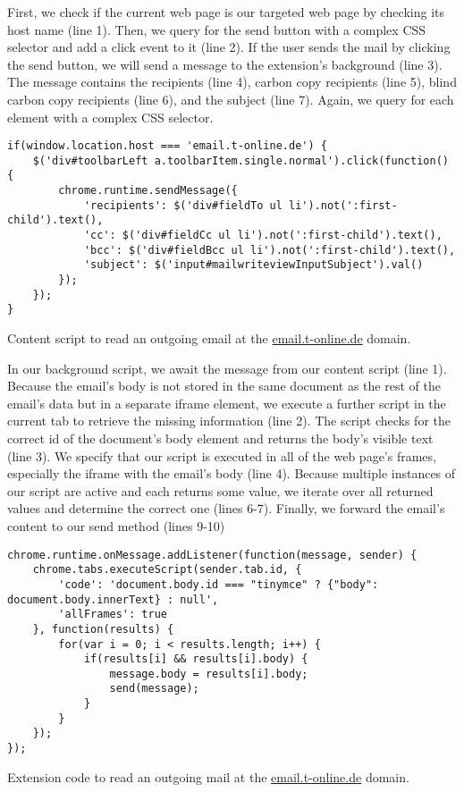 	First, we check if the current web page is our targeted web page by checking its host name (line 1). Then, we query for the send button with a complex CSS selector and add a click event to it (line 2). If the user sends the mail by clicking the send button, we will send a message to the extension's background (line 3). The message contains the recipients (line 4), carbon copy recipients (line 5), blind carbon copy recipients (line 6), and the subject (line 7). Again, we query for each element with a complex CSS selector.
	
	\begin{code}
		\begin{lstlisting}
if(window.location.host === 'email.t-online.de') {
	$('div#toolbarLeft a.toolbarItem.single.normal').click(function() {
		chrome.runtime.sendMessage({
			'recipients': $('div#fieldTo ul li').not(':first-child').text(),
			'cc': $('div#fieldCc ul li').not(':first-child').text(),
			'bcc': $('div#fieldBcc ul li').not(':first-child').text(),
			'subject': $('input#mailwriteviewInputSubject').val()
		});
	});
}
\end{lstlisting}
		\caption{Content script to read an outgoing email at the \url{email.t-online.de} domain.}
		\label{code:readOutgoingMailContent}
	\end{code}
	
	In our background script, we await the message from our content script (line 1). Because the email's body is not stored in the same document as the rest of the email's data but in a separate iframe element, we execute a further script in the current tab to retrieve the missing information (line 2). The script checks for the correct id of the document's body element and returns the body's visible text (line 3). We specify that our script is executed in all of the web page's frames, especially the iframe with the email's body (line 4). Because multiple instances of our script are active and each returns some value, we iterate over all returned values and determine the correct one (lines 6-7). Finally, we forward the email's content to our send method (lines 9-10) 
	
	\begin{code}
		\begin{lstlisting}
chrome.runtime.onMessage.addListener(function(message, sender) {
	chrome.tabs.executeScript(sender.tab.id, {
		'code': 'document.body.id === "tinymce" ? {"body": document.body.innerText} : null',
		'allFrames': true
	}, function(results) {
		for(var i = 0; i < results.length; i++) {
			if(results[i] && results[i].body) {
				message.body = results[i].body;
				send(message);
			}
		}
	});
});
\end{lstlisting}
		\caption{Extension code to read an outgoing mail at the \url{email.t-online.de} domain.}
		\label{code:readOutgoingMailBackground}
	\end{code}
	
